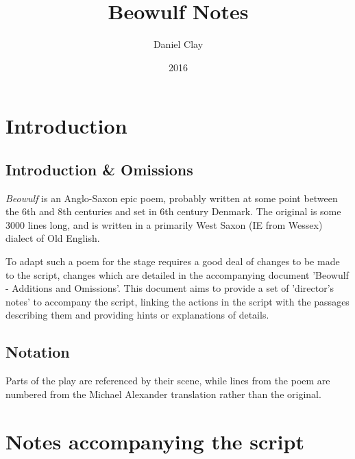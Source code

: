 \documentclass[a4paper]{article}
\begin{document}
\title{Beowulf Notes}
\date{2016}
\author{
Daniel Clay \\ 
}
\maketitle

\section{Introduction}

\subsection{Introduction \& Omissions}%

\textit{Beowulf} is an Anglo-Saxon epic poem, probably written at some point 
between the 6th and 8th centuries and set in 6th century Denmark. The original
is some 3000 lines long, and is written in a primarily West Saxon (IE from Wessex)
dialect of Old English.

To adapt such a poem for the stage requires a good deal of changes to be made
to the script, changes which are detailed in the accompanying document
'Beowulf - Additions and Omissions'. This document aims to provide a set of
'director's notes' to accompany the script, linking the actions in the script
with the passages describing them and providing hints or explanations of details.

\subsection{Notation}%

Parts of the play are referenced by their scene, while lines from the poem are
numbered from the Michael Alexander translation rather than the original.

\section{Notes accompanying the script}
\end{document}
